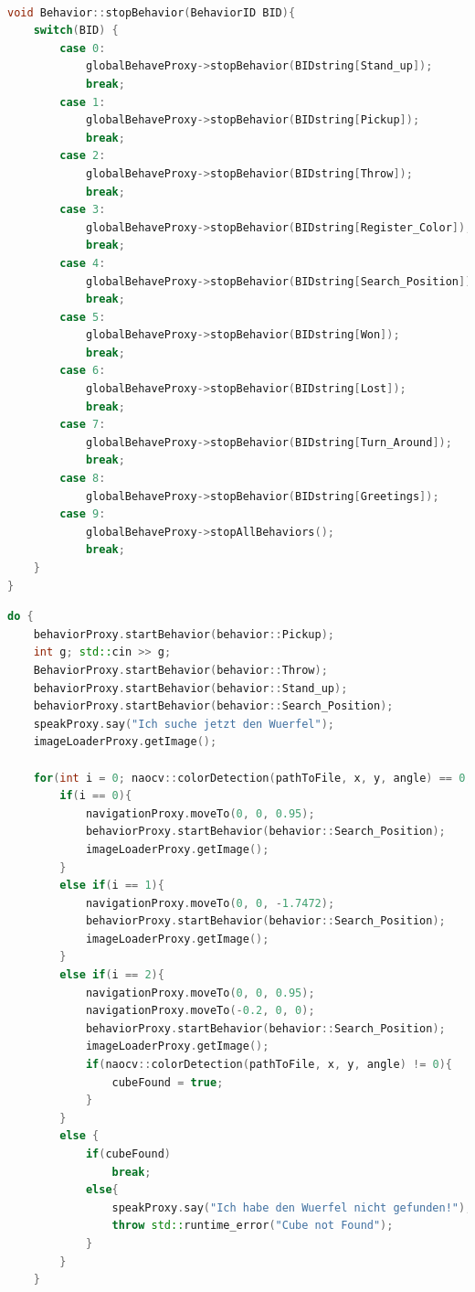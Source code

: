 \begin{appendix}
\begin{lstlisting}[language=c++,
                   caption={Behaviour Enumerator},
                   label={lst:behstop}]

void Behavior::stopBehavior(BehaviorID BID){
    switch(BID) {
        case 0:
            globalBehaveProxy->stopBehavior(BIDstring[Stand_up]);
            break;
        case 1:
            globalBehaveProxy->stopBehavior(BIDstring[Pickup]);
            break;
        case 2:
            globalBehaveProxy->stopBehavior(BIDstring[Throw]);
            break;
        case 3:
            globalBehaveProxy->stopBehavior(BIDstring[Register_Color]);
            break;
        case 4:
            globalBehaveProxy->stopBehavior(BIDstring[Search_Position]);
            break;
        case 5:
            globalBehaveProxy->stopBehavior(BIDstring[Won]);
            break;
        case 6:
            globalBehaveProxy->stopBehavior(BIDstring[Lost]);
            break;
        case 7:
            globalBehaveProxy->stopBehavior(BIDstring[Turn_Around]);
            break;
        case 8:
            globalBehaveProxy->stopBehavior(BIDstring[Greetings]);
        case 9:
            globalBehaveProxy->stopAllBehaviors();
            break;
    }
}
\end{lstlisting}

\begin{lstlisting}[language=c++,
                   caption={Mainloop},
                   label={lst:main1}]
do {
    behaviorProxy.startBehavior(behavior::Pickup);
    int g; std::cin >> g;
    BehaviorProxy.startBehavior(behavior::Throw);
    behaviorProxy.startBehavior(behavior::Stand_up);
    behaviorProxy.startBehavior(behavior::Search_Position);
    speakProxy.say("Ich suche jetzt den Wuerfel");
    imageLoaderProxy.getImage();

    for(int i = 0; naocv::colorDetection(pathToFile, x, y, angle) == 0; i++){
        if(i == 0){
            navigationProxy.moveTo(0, 0, 0.95);
            behaviorProxy.startBehavior(behavior::Search_Position);
            imageLoaderProxy.getImage();
        }
        else if(i == 1){
            navigationProxy.moveTo(0, 0, -1.7472);
            behaviorProxy.startBehavior(behavior::Search_Position);
            imageLoaderProxy.getImage();
        }
        else if(i == 2){
            navigationProxy.moveTo(0, 0, 0.95);
            navigationProxy.moveTo(-0.2, 0, 0);
            behaviorProxy.startBehavior(behavior::Search_Position);
            imageLoaderProxy.getImage();
            if(naocv::colorDetection(pathToFile, x, y, angle) != 0){
                cubeFound = true;
            }
        }
        else {
            if(cubeFound)
                break;
            else{
                speakProxy.say("Ich habe den Wuerfel nicht gefunden!");
                throw std::runtime_error("Cube not Found");
            }
        }
    }


\end{lstlisting}
\end{appendix}
